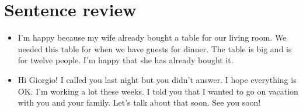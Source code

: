 \section{Sentence review} \label{0504-Sentences}
\begin{itemize}
	\item{I'm happy because my wife already bought a table for our living room. We needed this table
		for when we have guests for dinner. The table is big and is for twelve people.
		I'm happy that she has already bought it.} \\

	\item{Hi Giorgio! I called you last night but you didn't answer. I hope everything is OK.
		I'm working a lot these weeks. I told you that I wanted to go on vacation with you and your family.
		Let's talk about that soon. See you soon!} \\
\end{itemize}

